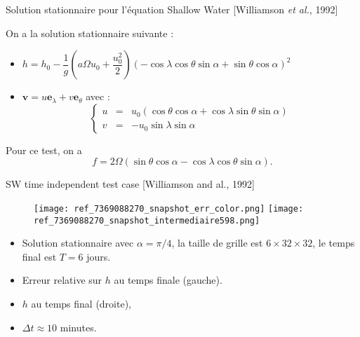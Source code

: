 \documentclass[11pt]{beamer}
\begin{document}

\begin{frame}{Solution stationnaire pour l'équation Shallow Water [Williamson \textit{et al.}, 1992]}

On a la solution stationnaire suivante :
\begin{exampleblock}{}
\begin{itemize}
\item $h = h_0 - \dfrac{1}{g} \left( a \Omega u_0 + \dfrac{u_0^2}{2} \right)\left( - \cos \lambda \cos \theta \sin \alpha + \sin \theta \cos \alpha \right)^2$
\item $\mathbf{v} = u \mathbf{e}_{\lambda}+ v \mathbf{e}_{\theta}$ avec :
\begin{equation*}
\left\lbrace \begin{array}{rcl}
 u & = & u_0 ( \cos \theta \cos \alpha + \cos \lambda \sin \theta \sin \alpha)\\
 v & = & -u_0 \sin \lambda \sin \alpha
 \end{array} \right.
\end{equation*}
\end{itemize}
\end{exampleblock}

\begin{exampleblock}{}
Pour ce test, on a
$$
f = 2 \Omega (\sin \theta \cos \alpha - \cos \lambda \cos \theta \sin \alpha).
$$
\end{exampleblock}
\end{frame}


\begin{frame}{SW time independent test case [Williamson and al., 1992]}
\begin{figure}
\texttt{[image: ref\_7369088270\_snapshot\_err\_color.png]}
\texttt{[image: ref\_7369088270\_snapshot\_intermediaire598.png]}
\end{figure}
\begin{itemize}
\item Solution stationnaire avec $\alpha=\pi/4$, la taille de grille est $6 \times 32 \times 32$, le temps final est $T=6$ jours.
\item Erreur relative sur $h$ au temps finale (gauche).
\item $h$ au temps final (droite),
\item $\Delta t \approx 10$ minutes.
\end{itemize}
\end{frame}
\end{document}
